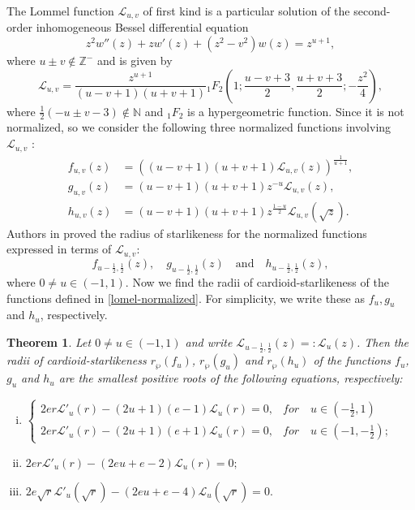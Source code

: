 \documentclass[12pt, reqno]{amsart}
\numberwithin{equation}{section}
\theoremstyle{plain}
\newtheorem{theorem}{Theorem}[section]
\theoremstyle{definition}
\theoremstyle{remark}
\begin{document}
The Lommel function $\mathcal{L}_{u,v}$ of first kind is a particular solution of the second-order inhomogeneous Bessel differential equation $$z^2w''(z)+zw'(z)+(z^2-{v}^2)w(z)=z^{u+1},$$
where $u\pm v\notin \mathbb{Z}^{-}$ and is given by
$$\mathcal{L}_{u,v}=\frac{z^{u+1}}{(u-v+1)(u+v+1)}{}_1F_2\left(1;\frac{u-v+3}{2},\frac{u+v+3}{2};-\frac{z^2}{4}\right),$$
where $\frac{1}{2}(-u\pm v-3)\notin \mathbb{N}$ and ${}_1 F_{2}$ is a hypergeometric function. Since it is not normalized, so we consider the following three normalized functions involving $\mathcal{L}_{u,v}$ :
\begin{align}\label{fL}
f_{u,v}(z)&=((u-v+1)(u+v+1)\mathcal{L}_{u,v}(z))^{\tfrac{1}{u+1}},\nonumber\\
g_{u,v}(z)&=(u-v+1)(u+v+1)z^{-u}\mathcal{L}_{u,v}(z),\nonumber\\
h_{u,v}(z)&=(u-v+1)(u+v+1)z^{\frac{1-u}{2}}\mathcal{L}_{u,v}(\sqrt{z}).
\end{align}
Authors in \cite{bdoy-2016,abo-2018} proved the radius of starlikeness for the normalized functions expressed in terms of $\mathcal{L}_{u,v}$:
\begin{equation}\label{lomel-normalized}
f_{u-\tfrac{1}{2},\tfrac{1}{2}}(z),\quad g_{u-\tfrac{1}{2},\tfrac{1}{2}}(z) \quad\text{and}\quad h_{u-\tfrac{1}{2},\tfrac{1}{2}}(z),
\end{equation} 
where $0\neq u\in (-1,1)$.
Now we find the radii of cardioid-starlikeness of the functions defined in \eqref{lomel-normalized}. For simplicity, we write these as $f_{u}, g_{u}$ and $h_{u}$, respectively.
\begin{theorem}\label{4}
	Let $0\neq u\in(-1,1)$ and write $\mathcal{L}_{u-\tfrac{1}{2}, \tfrac{1}{2}}(z)=:\mathcal{L}_{u}(z)$. Then the radii of cardioid-starlikeness $r_{\wp}(f_{u})$, $r_{\wp}(g_{u})$ and $r_{\wp}(h_{u})$ of the functions $f_{u}$, $g_{u}$ and $h_{u}$ are the smallest positive roots of the following equations, respectively:
	\begin{enumerate}[(i)]
		\item $\left\{
		\begin{array}
		{ll}
		2er\mathcal{L}'_{u}(r)-(2u+1)(e-1)\mathcal{L}_{u}(r)=0,     & for\quad u\in(-\frac{1}{2},1) \\
		2er\mathcal{L}'_{u}(r)-(2u+1)(e+1)\mathcal{L}_{u}(r)=0, & for\quad u\in(-1,-\frac{1}{2});
		\end{array}
		\right.$
		
		\item $2er\mathcal{L}'_{u}(r)-(2eu+e-2)\mathcal{L}_{u}(r)=0;$
		\item $2e\sqrt{r}\mathcal{L}'_{u}(\sqrt{r})-(2eu+e-4)\mathcal{L}_{u}(\sqrt{r})=0.$
	\end{enumerate}	
\end{theorem}
\end{document}
